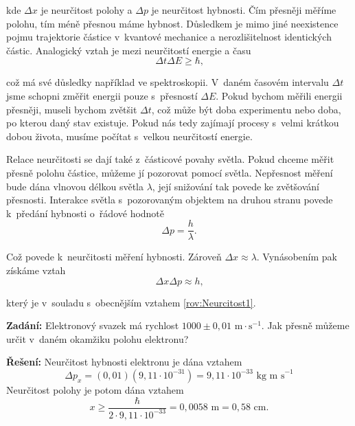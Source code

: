 \noindent kde $\Delta x$ je neurčitost polohy a $\Delta p$ je neurčitost hybnosti. Čím přesněji měříme polohu, tím méně přesnou máme hybnost. Důsledkem je mimo jiné neexistence pojmu trajektorie částice v~kvantové mechanice a nerozlišitelnost identických částic. Analogický vztah je mezi neurčitostí energie a času
\begin{equation}
\boxed{\Delta t \Delta E \geq \hbar\mbox{,}}
\label{rov:Neurcitostě}
\end{equation}

\noindent což má své důsledky například ve spektroskopii. V~daném časovém intervalu $\Delta t$ jsme schopni změřit energii pouze s~přesností $\Delta E$. Pokud bychom měřili energii přesněji, museli bychom zvětšit $\Delta t$, což může být doba experimentu nebo doba, po kterou daný stav existuje. Pokud nás tedy zajímají procesy s~velmi krátkou dobou života, musíme počítat s~velkou neurčitostí energie.  

Relace neurčitosti se dají  také z~částicové povahy světla. Pokud chceme měřit přesně polohu částice, můžeme jí pozorovat pomocí světla. Nepřesnost měření bude dána vlnovou délkou světla $\lambda$, její snižování tak povede ke zvětšování přesnosti. Interakce světla s~pozorovaným objektem na druhou stranu povede k~předání hybnosti o~řádové hodnotě
\begin{equation}
\Delta p = \frac{h}{\lambda}.
\label{rov:Neurcitost2}
\end{equation}

\noindent Což povede k~neurčitosti měření hybnosti. Zároveň $\Delta x \approx \lambda $. Vynásobením pak získáme vztah
\begin{equation}
\Delta x \Delta p \approx h \mbox{,}
\label{rov:Neurcitost3}
\end{equation}

\noindent který je v~souladu s~obecnějším vztahem \ref{rov:Neurcitost1}.
 
\begin{priklad}
\textbf{Zadání:} Elektronový svazek má rychlost $1000 \pm 0{,}01 \mbox{ m}\cdot \mbox{s}^{-1}$. Jak přesně můžeme určit v~daném okamžiku polohu elektronu?

\textbf{Řešení:} Neurčitost hybnosti elektronu je dána vztahem
\begin{displaymath}
\Delta p_x = (0{,}01)(9{,}11 \cdot 10^{-31}) = 9{,}11\cdot 10^{-33} \mbox{ kg m s}^{-1}
\end{displaymath}
Neurčitost polohy je potom dána vztahem
\begin{displaymath}
x\geq\frac{\hbar}{2\cdot 9{,}11\cdot 10^{-33}} = 0{,}0058 \mbox{ m} = 0{,}58 \mbox{ cm}.
\end{displaymath}
\end{priklad}

